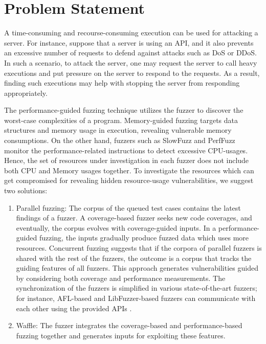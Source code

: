 \section{Problem Statement}

A time-consuming and recourse-consuming execution can be used for attacking a server. For instance, suppose that a server is using an API, and it also prevents an excessive number of requests to defend against attacks such as DoS or DDoS. In such a scenario, to attack the server, one may request the server to call heavy executions and put pressure on the server to respond to the requests. As a result, finding such executions may help with stopping the server from responding appropriately.

The performance-guided fuzzing technique utilizes the fuzzer to discover the worst-case complexities of a program. Memory-guided fuzzing targets data structures and memory usage in execution, revealing vulnerable memory consumptions. On the other hand, fuzzers such as SlowFuzz and PerfFuzz monitor the performance-related instructions to detect excessive CPU-usages. Hence, the set of resources under investigation in each fuzzer does not include both CPU and Memory usages together. To investigate the resources which can get compromised for revealing hidden resource-usage vulnerabilities, we suggest two solutions:

\begin{enumerate}
    \item Parallel fuzzing: The corpus of the queued test cases contains the latest findings of a fuzzer. A coverage-based fuzzer seeks new code coverages, and eventually, the corpus evolves with coverage-guided inputs. In a performance-guided fuzzing, the inputs gradually produce fuzzed data which uses more resources. Concurrent fuzzing suggests that if the corpora of parallel fuzzers is shared with the rest of the fuzzers, the outcome is a corpus that tracks the guiding features of all fuzzers. This approach generates vulnerabilities guided by considering both coverage and performance measurements. The synchronization of the fuzzers is simplified in various state-of-the-art fuzzers; for instance, AFL-based and LibFuzzer-based fuzzers can communicate with each other using the provided APIs \cite{afl_par}.
    
    \item Waffle: The fuzzer integrates the coverage-based and performance-based fuzzing together and generates inputs for exploiting these features.
\end{enumerate}

